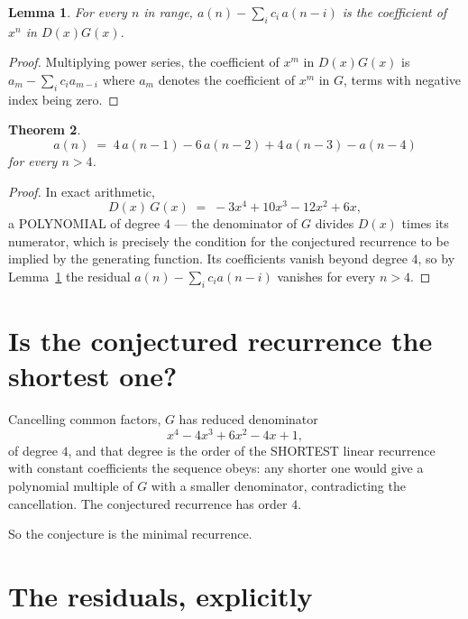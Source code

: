 \documentclass[11pt,a4paper]{article}
\theoremstyle{plain}
\newtheorem{theorem}{Theorem}
\newtheorem{lemma}[theorem]{Lemma}
\theoremstyle{definition}
\begin{document}
\begin{lemma}\label{lem:key}
For every $n$ in range, $a(n)-\sum_i c_i\,a(n-i)$ is the coefficient of $x^{n}$ in
$D(x)G(x)$.
\end{lemma}

\begin{proof}
Multiplying power series, the coefficient of $x^{m}$ in $D(x)G(x)$ is
$a_m-\sum_i c_i a_{m-i}$ where $a_m$ denotes the coefficient of $x^{m}$ in $G$, terms with
negative index being zero.
\end{proof}

\begin{theorem}
\[
a(n)\;=\;4\,a(n-1) - 6\,a(n-2) + 4\,a(n-3) - a(n-4)
\]
for every $n>4$.
\end{theorem}

\begin{proof}
In exact arithmetic,
\[
D(x)\,G(x)\;=\;- 3 x^{4} + 10 x^{3} - 12 x^{2} + 6 x,
\]
a POLYNOMIAL of degree $4$ --- the denominator of $G$ divides $D(x)$ times its numerator,
which is precisely the condition for the conjectured recurrence to be implied by the
generating function. Its coefficients vanish beyond degree $4$, so by
Lemma~\ref{lem:key} the residual $a(n)-\sum_ic_ia(n-i)$ vanishes for every
$n>4$.
\end{proof}

\section{Is the conjectured recurrence the shortest one?}

Cancelling common factors, $G$ has reduced denominator
\[
x^{4} - 4 x^{3} + 6 x^{2} - 4 x + 1,
\]
of degree $4$, and that degree is the order of the SHORTEST linear recurrence with
constant coefficients the sequence obeys: any shorter one would give a polynomial multiple of
$G$ with a smaller denominator, contradicting the cancellation. The conjectured recurrence has
order $4$.

So the conjecture is the minimal recurrence.

\section{The residuals, explicitly}
\end{document}
